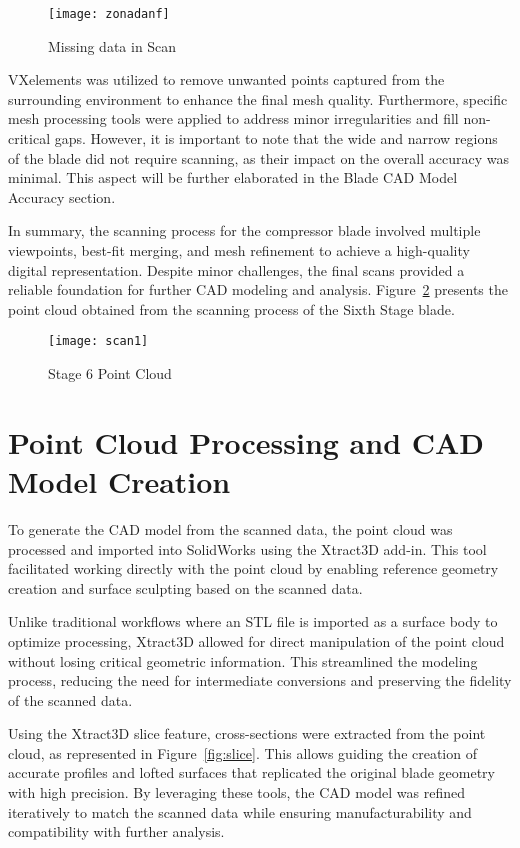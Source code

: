 \begin{figure}[H]
    \centering
    \texttt{[image: zonadanf]}
    \caption{Missing data in Scan}
    \label{fig:zonadanf}
\end{figure}

VXelements was utilized to remove unwanted points captured from the surrounding environment to enhance the final mesh quality. Furthermore, specific mesh processing tools were applied to address minor irregularities and fill non-critical gaps. However, it is important to note that the wide and narrow regions of the blade did not require scanning, as their impact on the overall accuracy was minimal. This aspect will be further elaborated in the Blade CAD Model Accuracy section.

In summary, the scanning process for the compressor blade involved multiple viewpoints, best-fit merging, and mesh refinement to achieve a high-quality digital representation. Despite minor challenges, the final scans provided a reliable foundation for further CAD modeling and analysis. Figure~\ref{fig:scan1} presents the point cloud obtained from the scanning process of the Sixth Stage blade.

\begin{figure}[H]
    \centering
    \texttt{[image: scan1]}
    \caption{Stage 6 Point Cloud}
    \label{fig:scan1}
\end{figure}

\section{Point Cloud Processing and CAD Model Creation}
\label{sec:cad}

To generate the CAD model from the scanned data, the point cloud was processed and imported into SolidWorks using the Xtract3D add-in. This tool facilitated working directly with the point cloud by enabling reference geometry creation and surface sculpting based on the scanned data.

Unlike traditional workflows where an STL file is imported as a surface body to optimize processing, Xtract3D allowed for direct manipulation of the point cloud without losing critical geometric information. This streamlined the modeling process, reducing the need for intermediate conversions and preserving the fidelity of the scanned data.

Using the Xtract3D slice feature, cross-sections were extracted from the point cloud, as represented in Figure~\ref{fig:slice}. This allows guiding the creation of accurate profiles and lofted surfaces that replicated the original blade geometry with high precision. By leveraging these tools, the CAD model was refined iteratively to match the scanned data while ensuring manufacturability and compatibility with further analysis.

